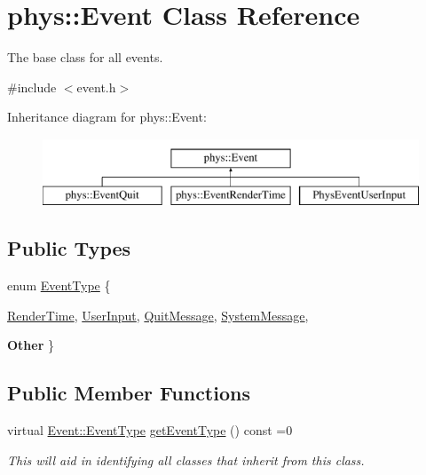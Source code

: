 \hypertarget{classphys_1_1Event}{
\section{phys::Event Class Reference}
\label{d5/dcb/classphys_1_1Event}
}


The base class for all events.  




{\ttfamily \#include $<$event.h$>$}

Inheritance diagram for phys::Event:\begin{figure}[H]
\begin{center}
\leavevmode
\includegraphics[height=2cm]{d5/dcb/classphys_1_1Event}
\end{center}
\end{figure}
\subsection*{Public Types}
\begin{DoxyCompactItemize}
\item 
enum \hyperlink{classphys_1_1Event_af5fdbb3e08d8e578d58770fbc606fda7}{EventType} \{ \par
\hyperlink{classphys_1_1Event_af5fdbb3e08d8e578d58770fbc606fda7a72c30ea5e5c4f5cb55382ad0d1317aa8}{RenderTime}, 
\hyperlink{classphys_1_1Event_af5fdbb3e08d8e578d58770fbc606fda7a91c3cf8e29385c1e10925d3bd4778cfc}{UserInput}, 
\hyperlink{classphys_1_1Event_af5fdbb3e08d8e578d58770fbc606fda7a085b70182742e0cc874f04f8aa615ff0}{QuitMessage}, 
\hyperlink{classphys_1_1Event_af5fdbb3e08d8e578d58770fbc606fda7a7558324b74ee7b6ec1e69d7ab1a13749}{SystemMessage}, 
\par
{\bfseries Other}
 \}
\end{DoxyCompactItemize}
\subsection*{Public Member Functions}
\begin{DoxyCompactItemize}
\item 
virtual \hyperlink{classphys_1_1Event_af5fdbb3e08d8e578d58770fbc606fda7}{Event::EventType} \hyperlink{classphys_1_1Event_ac2c0623a6bc399e62f4b9fb2c022ea73}{getEventType} () const =0
\begin{DoxyCompactList}\small\item\em This will aid in identifying all classes that inherit from this class. \item\end{DoxyCompactList}\end{DoxyCompactItemize}


